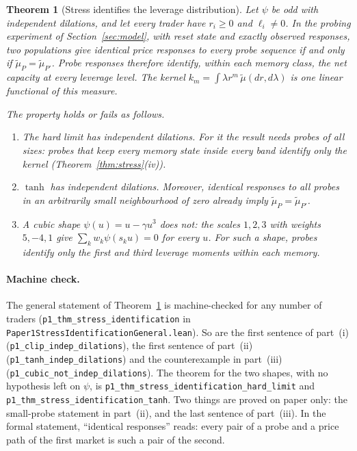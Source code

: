 \documentclass[12pt]{article}
\newtheorem{theorem}{Theorem}[section]
\theoremstyle{definition}
\theoremstyle{remark}
\begin{document}
\begin{theorem}[Stress identifies the leverage distribution]\label{thm:satident}
Let $\psi$ be odd with independent dilations, and let every trader have $r_i\ge0$ and $\ell_i\ne0$. In the probing experiment of Section~\ref{sec:model}, with reset state and exactly observed responses, two populations give identical price responses to every probe sequence if and only if $\tilde\mu_P=\tilde\mu_{P'}$. Probe responses therefore identify, within each memory class, the net capacity at every leverage level. The kernel $k_m=\int\lambda r^m\,\tilde\mu(dr,d\lambda)$ is one linear functional of this measure.

The property holds or fails as follows.
\begin{enumerate}[label=(\roman*),itemsep=1pt]
\item The hard limit has independent dilations. For it the result needs probes of all sizes: probes that keep every memory state inside every band identify only the kernel (Theorem~\ref{thm:stress}(iv)).
\item $\tanh$ has independent dilations. Moreover, identical responses to all probes in an arbitrarily small neighbourhood of zero already imply $\tilde\mu_P=\tilde\mu_{P'}$.
\item A cubic shape $\psi(u)=u-\gamma u^3$ does not: the scales $1,2,3$ with weights $5,-4,1$ give $\sum_kw_k\psi(s_ku)=0$ for every $u$. For such a shape, probes identify only the first and third leverage moments within each memory.
\end{enumerate}
\end{theorem}

\paragraph{Machine check.} The general statement of Theorem~\ref{thm:satident} is machine-checked for any number of traders (\texttt{p1\_thm\_stress\_identification} in \nolinkurl{Paper1StressIdentificationGeneral.lean}). So are the first sentence of part~(i) (\texttt{p1\_clip\_indep\_dilations}), the first sentence of part~(ii) (\texttt{p1\_tanh\_indep\_dilations}) and the counterexample in part~(iii) (\texttt{p1\_cubic\_not\_indep\_dilations}). The theorem for the two shapes, with no hypothesis left on $\psi$, is \nolinkurl{p1_thm_stress_identification_hard_limit} and \nolinkurl{p1_thm_stress_identification_tanh}. Two things are proved on paper only: the small-probe statement in part~(ii), and the last sentence of part~(iii). In the formal statement, ``identical responses'' reads: every pair of a probe and a price path of the first market is such a pair of the second.
\end{document}
